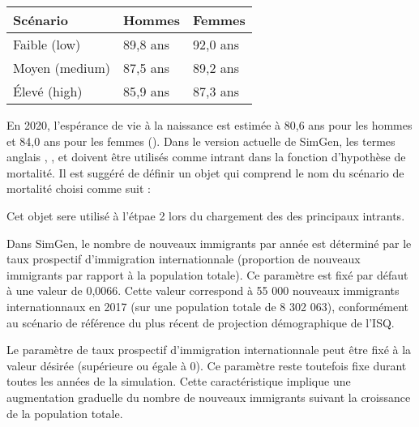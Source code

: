 \documentclass[letterpaper,10pt,french]{sphinxmanual}
\begin{document}
\begin{savenotes}\sphinxattablestart
\centering
\begin{tabulary}{\linewidth}[t]{|T|T|T|}
\hline
\sphinxstyletheadfamily 
Scénario
&\sphinxstyletheadfamily 
Hommes
&\sphinxstyletheadfamily 
Femmes
\\
\hline
Faible (low)
&
89,8 ans
&
92,0 ans
\\
\hline
Moyen (medium)
&
87,5 ans
&
89,2 ans
\\
\hline
Élevé (high)
&
85,9 ans
&
87,3 ans
\\
\hline
\end{tabulary}
\par
\sphinxattableend\end{savenotes}

En 2020, l’espérance de vie à la naissance est estimée à 80,6 ans pour les hommes et 84,0 ans pour les femmes ().
Dans le version actuelle de SimGen, les termes anglais , , et  doivent être utilisés comme intrant dans la fonction d’hypothèse de mortalité.
Il est suggéré de définir un objet qui comprend le nom du scénario de mortalité choisi comme suit :

\begin{sphinxVerbatim}[commandchars=\\\{\}]
  
\end{sphinxVerbatim}

Cet objet sere utilisé à l’étpae 2 lors du chargement des des principaux intrants.


Dans SimGen, le nombre de nouveaux immigrants par année est déterminé par le taux prospectif d’immigration internationnale
(proportion de nouveaux immigrants par rapport à la population totale).
Ce paramètre est fixé par défaut à une valeur de 0,0066.
Cette valeur correspond à 55 000 nouveaux immigrants internationnaux en 2017 (sur une population totale de 8 302 063),
conformément au scénario de référence du plus récent  de projection démographique de l’ISQ.

Le paramètre de taux prospectif d’immigration internationnale peut être fixé à la valeur désirée (supérieure ou égale à 0).
Ce paramètre reste toutefois fixe durant toutes les années de la simulation.
Cette caractéristique implique une augmentation graduelle du nombre de nouveaux immigrants suivant la croissance de la population totale.
\end{document}
